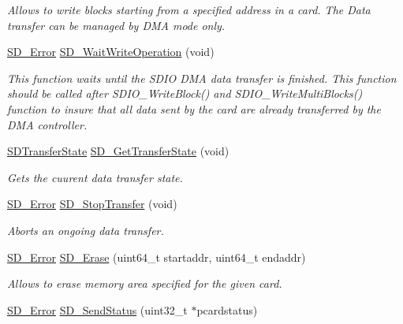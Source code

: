 \begin{DoxyCompactItemize}
\begin{DoxyCompactList}\small\item\em Allows to write blocks starting from a specified address in a card. The Data transfer can be managed by D\+MA mode only. \end{DoxyCompactList}\item 
\hyperlink{group__sd__card_gacff91fa68daa1d1ee967b5b3fb3dbd8c}{S\+D\+\_\+\+Error} \hyperlink{group__sd__card__private_gad55967ea67075f01671fb2144c7f7b0d}{S\+D\+\_\+\+Wait\+Write\+Operation} (void)
\begin{DoxyCompactList}\small\item\em This function waits until the S\+D\+IO D\+MA data transfer is finished. This function should be called after S\+D\+I\+O\+\_\+\+Write\+Block() and S\+D\+I\+O\+\_\+\+Write\+Multi\+Blocks() function to insure that all data sent by the card are already transferred by the D\+MA controller. \end{DoxyCompactList}\item 
\hyperlink{group__sd__card_gace0484a459648257c3eae8ea60f64fbf}{S\+D\+Transfer\+State} \hyperlink{group__sd__card__private_ga2dd79455185c28bd21964d113a38d110}{S\+D\+\_\+\+Get\+Transfer\+State} (void)
\begin{DoxyCompactList}\small\item\em Gets the cuurent data transfer state. \end{DoxyCompactList}\item 
\hyperlink{group__sd__card_gacff91fa68daa1d1ee967b5b3fb3dbd8c}{S\+D\+\_\+\+Error} \hyperlink{group__sd__card__private_gad3dc52f076ae8145e105cb4d8a37b043}{S\+D\+\_\+\+Stop\+Transfer} (void)
\begin{DoxyCompactList}\small\item\em Aborts an ongoing data transfer. \end{DoxyCompactList}\item 
\hyperlink{group__sd__card_gacff91fa68daa1d1ee967b5b3fb3dbd8c}{S\+D\+\_\+\+Error} \hyperlink{group__sd__card__private_gaca2450c63f52cd6c1d50f6de33ecfdf8}{S\+D\+\_\+\+Erase} (uint64\+\_\+t startaddr, uint64\+\_\+t endaddr)
\begin{DoxyCompactList}\small\item\em Allows to erase memory area specified for the given card. \end{DoxyCompactList}\item 
\hyperlink{group__sd__card_gacff91fa68daa1d1ee967b5b3fb3dbd8c}{S\+D\+\_\+\+Error} \hyperlink{group__sd__card__private_ga7de24baeb4c6a7c9e5668630b8797888}{S\+D\+\_\+\+Send\+Status} (uint32\+\_\+t $\ast$pcardstatus)

\end{DoxyCompactItemize}
